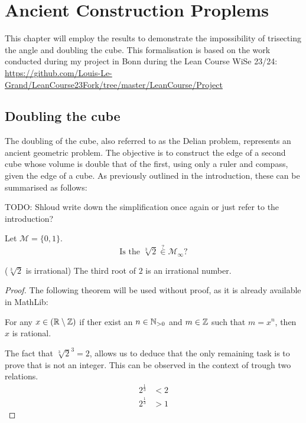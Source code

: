 \chapter{Ancient Construction Proplems}
This chapter will employ the results to demonstrate the impossibility of trisecting the angle and doubling the cube. 
This formalisation is based on the work conducted during my project in Bonn during the Lean Course WiSe 23/24: 
\url{https://github.com/Louis-Le-Grand/LeanCourse23Fork/tree/master/LeanCourse/Project}

\section{Doubling the cube}
The doubling of the cube, also referred to as the Delian problem, represents an ancient geometric problem.
The objective is to construct the edge of a second cube whose volume is double that of the first, using only a ruler and compass, given the edge of a cube.
As previously outlined in the introduction, these can be summarised as follows: 

TODO: Shloud write down the simplification once again or just refer to the introduction?
\begin{problem}
    Let $\mathcal{M} = \{0,1\}$.  
    \begin{equation*}\text{Is the }\sqrt[3]{2} \overset{?}{\in} \mathcal{M}_{\infty}?\end{equation*}
\end{problem}

\begin{lemma}($\sqrt[3]{2}$ is irrational)
    \label{lem:irrational_thirdroot_two}
    \leanok
    The third root of $2$ is an irrational number.
\end{lemma}
\begin{proof}
    The following theorem will be used without proof, as it is already available in MathLib:
    \begin{theorem*}
        For any $x\in(\mathbb{R}\setminus\mathbb{Z})$ if ther exist an $n\in \mathbb{N}_{>0}$ and $m\in\mathbb{Z}$ such that $m = x^n$, then $x$ is rational. 
    \end{theorem*}
    The fact that $\sqrt[3]{2}^3=2$, allows us to deduce that the only remaining task is to prove that is not an integer. 
    This can be observed in the context of trough two relations.
    \begin{align}
        2^{\frac{1}{3}} &< 2 \\
        2^{\frac{1}{3}} &> 1
    \end{align}
\end{proof}

